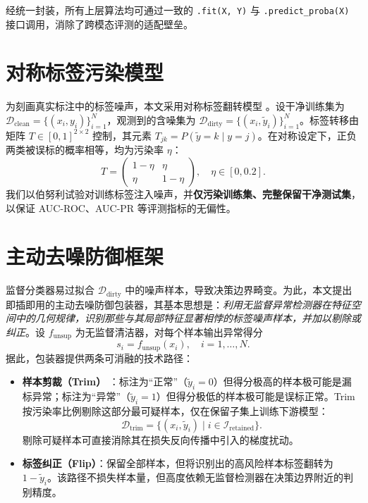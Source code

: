 经统一封装，所有上层算法均可通过一致的 \texttt{.fit(X, Y)} 与 \texttt{.predict\_proba(X)} 接口调用，消除了跨模态评测的适配壁垒。

\section{对称标签污染模型}

为刻画真实标注中的标签噪声，本文采用对称标签翻转模型 \cite{frenay2013labelnoise}。设干净训练集为 $\mathcal{D}_{\text{clean}}=\{(x_i,y_i)\}_{i=1}^N$，观测到的含噪集为 $\mathcal{D}_{\text{dirty}}=\{(x_i,\tilde{y}_i)\}_{i=1}^N$。标签转移由矩阵 $T\in[0,1]^{2\times2}$ 控制，其元素 $T_{jk}=P(\tilde{y}=k\mid y=j)$。在对称设定下，正负两类被误标的概率相等，均为污染率 $\eta$：
\begin{equation}\label{eq:noise-transition-matrix}
    T=\begin{pmatrix} 1-\eta & \eta \\ \eta & 1-\eta \end{pmatrix},\quad \eta\in[0,0.2].
\end{equation}
我们以伯努利试验对训练标签注入噪声，并\textbf{仅污染训练集、完整保留干净测试集}，以保证 AUC-ROC、AUC-PR 等评测指标的无偏性。

\section{主动去噪防御框架}

监督分类器易过拟合 $\mathcal{D}_{\text{dirty}}$ 中的噪声样本，导致决策边界畸变。为此，本文提出即插即用的主动去噪防御包装器，其基本思想是：\emph{利用无监督异常检测器在特征空间中的几何规律，识别那些与其局部特征显著相悖的标签噪声样本，并加以剔除或纠正}。设 $f_{\text{unsup}}$ 为无监督清洁器，对每个样本输出异常得分
\begin{equation}\label{eq:unsupervised-score}
    s_i=f_{\text{unsup}}(x_i),\quad i=1,\dots,N.
\end{equation}
据此，包装器提供两条可消融的技术路径：

\begin{itemize}
    \item \textbf{样本剪裁（Trim）} \cite{jiang2020trim}：标注为“正常”（$\tilde{y}_i=0$）但得分极高的样本极可能是漏标异常；标注为“异常”（$\tilde{y}_i=1$）但得分极低的样本极可能是误标正常。Trim 按污染率比例剔除这部分最可疑样本，仅在保留子集上训练下游模型：
    \begin{equation}\label{eq:trim-set}
        \mathcal{D}_{\text{trim}}=\{(x_i,\tilde{y}_i)\mid i\in\mathcal{I}_{\text{retained}}\}.
    \end{equation}
    剔除可疑样本可直接消除其在损失反向传播中引入的梯度扰动。
    \item \textbf{标签纠正（Flip）}：保留全部样本，但将识别出的高风险样本标签翻转为 $1-\tilde{y}_i$。该路径不损失样本量，但高度依赖无监督检测器在决策边界附近的判别精度。
\end{itemize}

